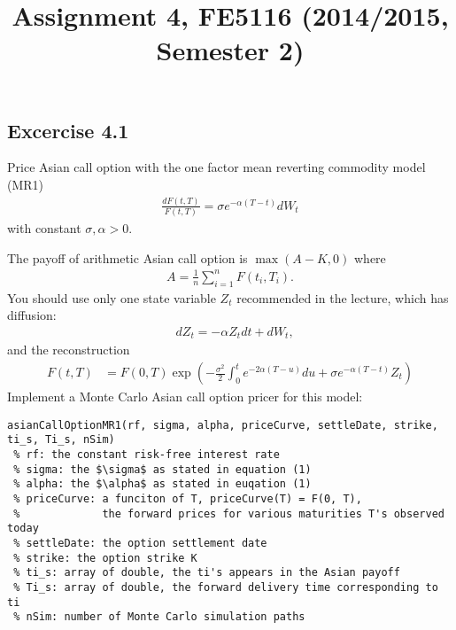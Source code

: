 \documentclass[10pt,a4paper,hidelinks,fleqn]{article}            %
\title{\vspace{-5ex}Assignment 4, FE5116 (2014/2015, Semester 2)\vspace{-7ex}}
\date{}
\begin{document}
\maketitle

\subsection*{Excercise 4.1}
Price Asian call option with the one factor mean reverting commodity model (MR1)
\begin{align}
\frac{dF(t, T)}{F(t, T)} = \sigma e^{-\alpha (T- t)} dW_t
\end{align}
with constant $\sigma, \alpha > 0$.

The payoff of arithmetic Asian call option is $\max(A - K, 0)$ where 
\begin{align}
A = \frac{1}{n}\sum_{i=1}^n F(t_i, T_i).
\label{eq:average}
\end{align} 
You should use only one state variable $Z_t$ recommended in the lecture, which has diffusion:
\begin{align}
& dZ_t = -\alpha Z_t dt + dW_t, 
\end{align}
and the reconstruction
\begin{align}
F(t, T) & = F(0, T) \exp\left( -\frac{\sigma^2}{2} \int_0^t e^{-2\alpha (T - u)} du + \sigma e^{-\alpha(T-t)} Z_t \right)
\end{align}
Implement a Monte Carlo Asian call option pricer for this model:
\vspace{-0.6cm}
\begin{lstlisting}
asianCallOptionMR1(rf, sigma, alpha, priceCurve, settleDate, strike, ti_s, Ti_s, nSim)
 % rf: the constant risk-free interest rate
 % sigma: the $\sigma$ as stated in equation (1) 
 % alpha: the $\alpha$ as stated in euqation (1)
 % priceCurve: a funciton of T, priceCurve(T) = F(0, T), 
 %             the forward prices for various maturities T's observed today 
 % settleDate: the option settlement date
 % strike: the option strike K
 % ti_s: array of double, the ti's appears in the Asian payoff
 % Ti_s: array of double, the forward delivery time corresponding to ti
 % nSim: number of Monte Carlo simulation paths
\end{lstlisting}
\vspace{-0.6cm}
\end{document}
